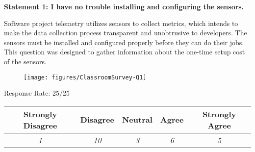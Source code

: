 \newpage
\textbf{Statement 1: I have no trouble installing and configuring the sensors.}

Software project telemetry utilizes sensors to collect metrics, which intends to make the data collection process transparent and unobtrusive to developers. The sensors must be installed and configured properly before they can do their jobs. This question was designed to gather information about the one-time setup cost of the sensors. 

\begin{quote}\end{quote} %

\begin{figure}[h]
  \center
  \texttt{[image: figures/ClassroomSurvey-Q1]}
  \label{fig:InClassSurvey-Q1}
\end{figure}

\begin{center}Response Rate: 25/25\end{center}
\begin{table}[h]
	\centering
		\begin{tabular}{|c|c|c|c|c|} 
			\hline
			\textbf{Strongly Disagree} & \textbf{Disagree} & \textbf{Neutral} & \textbf{Agree} & \textbf{Strongly Agree} \\
			\hline
			\textit{1} & \textit{10} & \textit{3} & \textit{6} &\textit{5} \\
			\hline
		\end{tabular}
	\label{table:InClassSurvey-Q1}
\end{table}

%

